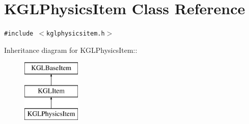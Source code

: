 \hypertarget{class_k_g_l_physics_item}{
\section{KGLPhysicsItem Class Reference}
\label{class_k_g_l_physics_item}
}
{\tt \#include $<$kglphysicsitem.h$>$}

Inheritance diagram for KGLPhysicsItem::\begin{figure}[H]
\begin{center}
\leavevmode
\includegraphics[height=3cm]{class_k_g_l_physics_item}
\end{center}
\end{figure}
